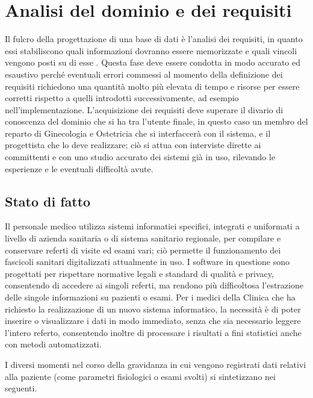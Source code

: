 \chapter{Analisi del dominio e dei requisiti}

Il fulcro della progettazione di una base di dati è l'analisi dei requisiti, in quanto essi stabiliscono quali informazioni dovranno essere memorizzate e quali vincoli vengono posti su di esse \cite{Ded16}.
Questa fase deve essere condotta in modo accurato ed esaustivo perché eventuali errori commessi al momento della definizione dei requisiti richiedono una quantità molto più elevata di tempo e risorse per essere corretti rispetto a quelli introdotti successivamente, ad esempio nell'implementazione.
L'acquisizione dei requisiti deve superare il divario di conoscenza del dominio che si ha tra l'utente finale, in questo caso un membro del reparto di Ginecologia e Ostetricia che si interfaccerà con il sistema, e il progettista che lo deve realizzare; ciò si attua con interviste dirette ai committenti e con uno studio accurato dei sistemi già in uso, rilevando le esperienze e le eventuali difficoltà avute.

\section{Stato di fatto}
\label{problem}

Il personale medico utilizza sistemi informatici specifici, integrati e uniformati a livello di azienda sanitaria o di sistema sanitario regionale, per compilare e conservare referti di visite ed esami vari; ciò permette il funzionamento dei fascicoli sanitari digitalizzati attualmente in uso.
I software in questione sono progettati per rispettare normative legali e standard di qualità e privacy, consentendo di accedere ai singoli referti, ma rendono più difficoltosa l'estrazione delle singole informazioni su pazienti o esami.
Per i medici della Clinica che ha richiesto la realizzazione di un nuovo sistema informatico, la necessità è di poter inserire o visualizzare i dati in modo immediato, senza che sia necessario leggere l'intero referto, consentendo inoltre di processare i risultati a fini statistici anche con metodi automatizzati.

I diversi momenti nel corso della gravidanza in cui vengono registrati dati relativi alla paziente (come parametri fisiologici o esami svolti) si sintetizzano nei seguenti.

